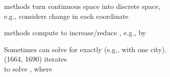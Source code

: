 \documentclass{article}
\begin{document}
\begin{huge}
 methods turn continuous space into discrete space,\\
e.g.,  considers \mat{$\pm \delta$} change in each coordinate

 methods compute 
\mat{\[
 \nabla f=\left(
  \frac{\partial f}{\partial x_1},\frac{\partial f}{\partial y_1},
  \frac{\partial f}{\partial x_2},\frac{\partial f}{\partial y_2},
  \frac{\partial f}{\partial x_3},\frac{\partial f}{\partial y_3}
 \right)
\]}
to increase/reduce , e.g., by 

Sometimes can solve for  exactly (e.g., with one city).\\
 (1664, 1690) iterates 
\\
to solve , where 

\end{huge}
\end{document}

